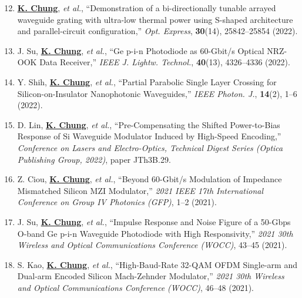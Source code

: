 \begin{enumerate}[label=\arabic*.] \setcounter{enumii}{11}
\justifying 

\item \underline{\textbf{K. Chung}}, \textit{et al.}, ``Demonstration of a bi-directionally tunable arrayed waveguide grating with ultra-low thermal power using S-shaped architecture and parallel-circuit configuration,'' \textit{Opt. Express}, \textbf{30}(14), 25842--25854 (2022).

\item J. Su, \underline{\textbf{K. Chung}}, \textit{et al.}, ``Ge p-i-n Photodiode as 60-Gbit/s Optical NRZ-OOK Data Receiver,'' \textit{IEEE J. Lightw. Technol.}, \textbf{40}(13), 4326--4336 (2022).

\item Y. Shih, \underline{\textbf{K. Chung}}, \textit{et al.}, ``Partial Parabolic Single Layer Crossing for Silicon-on-Insulator Nanophotonic Waveguides,'' \textit{IEEE Photon. J.}, \textbf{14}(2), 1--6 (2022).

\item D. Lin, \underline{\textbf{K. Chung}}, \textit{et al.}, ``Pre-Compensating the Shifted Power-to-Bias Response of Si Waveguide Modulator Induced by High-Speed Encoding,'' \textit{Conference on Lasers and Electro-Optics, Technical Digest Series (Optica Publishing Group, 2022)}, paper JTh3B.29.

\item Z. Ciou, \underline{\textbf{K. Chung}}, \textit{et al.}, ``Beyond 60-Gbit/s Modulation of Impedance Mismatched Silicon MZI Modulator,'' \textit{2021 IEEE 17th International Conference on Group IV Photonics (GFP)}, 1--2 (2021).

\item J. Su, \underline{\textbf{K. Chung}}, \textit{et al.}, ``Impulse Response and Noise Figure of a 50-Gbps O-band Ge p-i-n Waveguide Photodiode with High Responsivity,'' \textit{2021 30th Wireless and Optical Communications Conference (WOCC)}, 43--45 (2021).

\item S. Kao, \underline{\textbf{K. Chung}}, \textit{et al.}, ``High-Baud-Rate 32-QAM OFDM Single-arm and Dual-arm Encoded Silicon Mach-Zehnder Modulator,'' \textit{2021 30th Wireless and Optical Communications Conference (WOCC)}, 46--48 (2021).

\end{enumerate}

